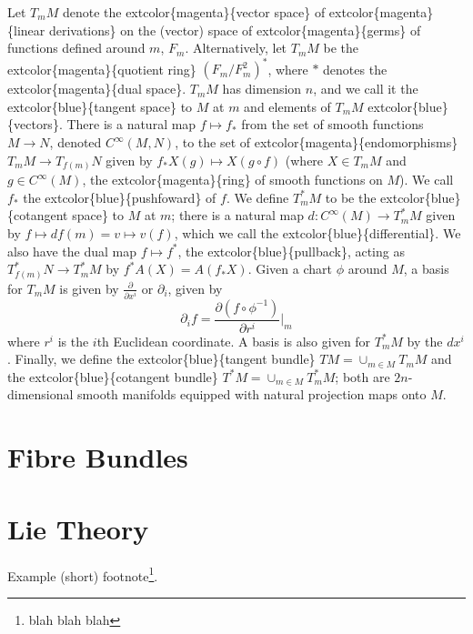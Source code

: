 \documentclass[
]{book}
\begin{document}
Let \(T_m M\) denote the extcolor\{magenta\}\{vector space\} of extcolor\{magenta\}\{linear derivations\} on the (vector) space of extcolor\{magenta\}\{germs\} of functions defined around \(m\), \(F_m\). Alternatively, let \(T_m M\) be the extcolor\{magenta\}\{quotient ring\} \((F_m/F_m^2)^*\), where \(*\) denotes the extcolor\{magenta\}\{dual space\}. \(T_m M\) has dimension \(n\), and we call it the extcolor\{blue\}\{tangent space\} to \(M\) at \(m\) and elements of \(T_m M\) extcolor\{blue\}\{vectors\}. There is a natural map \(f \mapsto f_*\) from the set of smooth functions \(M \to N\), denoted \(C^\infty(M,N)\), to the set of extcolor\{magenta\}\{endomorphisms\} \(T_m M \to T_{f(m)} N\) given by \(f_* X(g) \mapsto X(g \circ f)\) (where \(X \in T_m M\) and \(g \in C^\infty(M)\), the extcolor\{magenta\}\{ring\} of smooth functions on \(M\)). We call \(f_*\) the extcolor\{blue\}\{pushfoward\} of \(f\). We define \(T_m^* M\) to be the extcolor\{blue\}\{cotangent space\} to \(M\) at \(m\); there is a natural map \(d : C^\infty(M) \to T_m^* M\) given by \(f \mapsto df(m) = v \mapsto v(f)\), which we call the extcolor\{blue\}\{differential\}. We also have the dual map \(f \mapsto f^*\), the extcolor\{blue\}\{pullback\}, acting as \(T_{f(m)}^* N \to T_m^* M\) by \(f^* A(X) = A(f_* X)\). Given a chart \(\phi\) around \(M\), a basis for \(T_m M\) is given by \(\frac{\partial}{\partial x^i}\) or \(\partial_{i}\), given by
\begin{equation}     
    \partial_{i}f = \frac{\partial (f \circ \phi^{-1})}{\partial r^i}\Big|_m 
\end{equation}
where \(r^i\) is the \(i\)th Euclidean coordinate. A basis is also given for \(T^*_m M\) by the \(dx^i\). Finally, we define the extcolor\{blue\}\{tangent bundle\} \(TM = \cup_{m\in M} T_m M\) and the extcolor\{blue\}\{cotangent bundle\} \(T^*M = \cup_{m\in M} T_m^* M\); both are \(2n\)-dimensional smooth manifolds equipped with natural projection maps onto \(M\).

\hypertarget{fibre-bundles}{%
\chapter{Fibre Bundles}\label{fibre-bundles}}

\hypertarget{lie-theory}{%
\chapter{Lie Theory}\label{lie-theory}}

Example (short) footnote\footnote{blah blah blah}.
\end{document}
